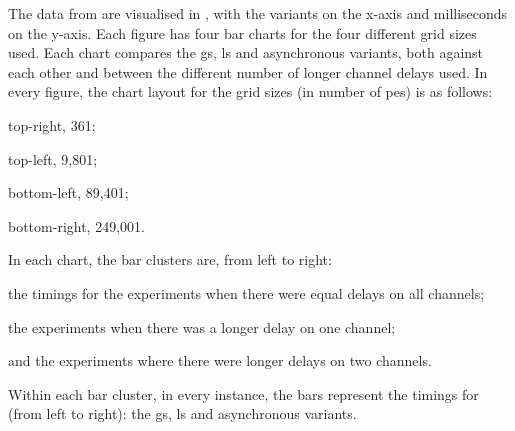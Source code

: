 \begin{table}
\centering
{}
\caption[Mean recorded running times for each  variant on a 48-core CPU]{Mean recorded running times in milliseconds for each \gls{nmp} variant in a simulation, with different sending delay lengths, on a computer with a CPU with 24/48 physical/logical cores}
\label{tab:nmp:simulation48cores}
\end{table}

The data from  are visualised in , with the variants on the x-axis and milliseconds on the y-axis.  Each figure has four bar charts for the four different grid sizes used.  Each chart compares the \gls{gs}, \gls{ls} and asynchronous variants, both against each other and between the different number of longer channel delays used.  In every figure, the chart layout for the grid sizes (in number of \glspl{pe}) is as follows:
\begin{inparablank}
\item top-right, 361;
\item top-left, 9,801;
\item bottom-left, 89,401;
\item bottom-right, 249,001.
\end{inparablank}
In each chart, the bar clusters are, from left to right:
\begin{inparaenum}[a)]
\item the timings for the experiments when there were equal delays on all channels;
\item the experiments when there was a longer delay on one channel;
\item and the experiments where there were longer delays on two channels.
\end{inparaenum}
Within each bar cluster, in every instance, the bars represent the timings for (from left to right):  the \gls{gs}, \gls{ls} and asynchronous variants.

